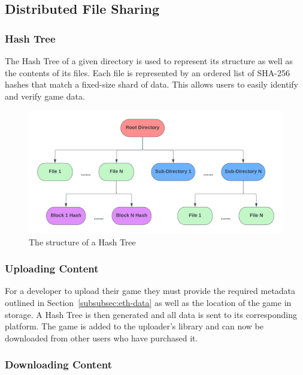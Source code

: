 \subsection{Distributed File Sharing}
\label{subsec:design-p2p}

\subsubsection*{Hash Tree}
\label{subsubsec:hash-tree}

The Hash Tree of a given directory is used to represent its structure as well as the contents of its files. Each file is represented by an ordered list of SHA-256 hashes that match a fixed-size shard of data. This allows users to easily identify and verify game data.

\begin{figure}[ht]
  \centering
  \includegraphics[width=.85\textwidth]{assets/images/diagrams/block-body.png}
  \caption{The structure of a Hash Tree}
  \label{fig:hash-storage}
\end{figure}

\subsubsection*{Uploading Content}
\label{subsubsec:upload-content}

For a developer to upload their game  they must provide the required metadata outlined in Section~\ref{subsubsec:eth-data} as well as the location of the game in storage. A Hash Tree is then generated and all data is sent to its corresponding platform. The game is added to the uploader's library and can now be downloaded from other users who have purchased it.

\subsubsection*{Downloading Content}

